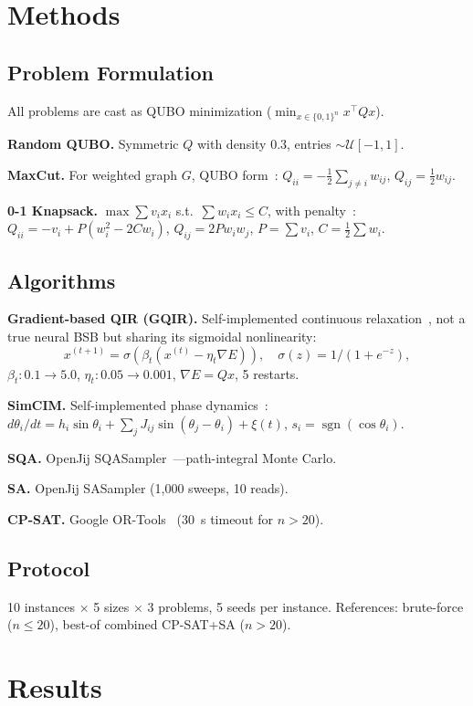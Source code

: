 \documentclass[10pt,twocolumn]{article}
\begin{document}
\section{Methods}
\label{sec:methods}

\subsection{Problem Formulation}
All problems are cast as QUBO minimization ($\min_{x\in\{0,1\}^n} x^\top Qx$).

\textbf{Random QUBO.} Symmetric $Q$ with density 0.3, entries $\sim\mathcal{U}[-1,1]$.

\textbf{MaxCut.} For weighted graph $G$, QUBO form~\cite{lucas2014}:
$Q_{ii}=-\frac12\sum_{j\neq i}w_{ij}$, $Q_{ij}=\frac12 w_{ij}$.

\textbf{0-1 Knapsack.} $\max\sum v_i x_i$ s.t.\ $\sum w_i x_i\leq C$, with penalty~\cite{gange2022}:
$Q_{ii} = -v_i + P(w_i^2-2Cw_i)$, $Q_{ij}=2P w_i w_j$, $P=\sum v_i$, $C=\frac12\sum w_i$.

\subsection{Algorithms}

\textbf{Gradient-based QIR (GQIR).} Self-implemented continuous relaxation~\cite{peterson1991}, not a true neural BSB but sharing its sigmoidal nonlinearity:
$$x^{(t+1)}=\sigma(\beta_t(x^{(t)}-\eta_t\nabla E)),\quad\sigma(z)=1/(1+e^{-z}),$$
$\beta_t:0.1\to5.0$, $\eta_t:0.05\to0.001$, $\nabla E=Qx$, 5 restarts.

\textbf{SimCIM.} Self-implemented phase dynamics~\cite{leleu2021}:
$d\theta_i/dt = h_i\sin\theta_i + \sum_j J_{ij}\sin(\theta_j-\theta_i)+\xi(t)$,
$s_i=\operatorname{sgn}(\cos\theta_i)$.

\textbf{SQA.} OpenJij SQASampler~\cite{openjij}---path-integral Monte Carlo.

\textbf{SA.} OpenJij SASampler (1,000 sweeps, 10 reads).

\textbf{CP-SAT.} Google OR-Tools~\cite{ortools} (30~s timeout for $n>20$).

\subsection{Protocol}
10 instances $\times$ 5 sizes $\times$ 3 problems, 5 seeds per instance. References: brute-force ($n\leq20$), best-of combined CP-SAT+SA ($n>20$).

\section{Results}
\label{sec:results}
\end{document}
